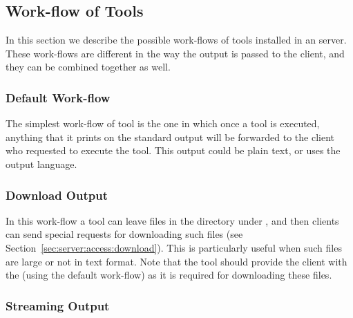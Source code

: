 \subsection{Work-flow of Tools}
\label{sec:server:config:workflow}

In this section we describe the possible work-flows of tools installed
in an \ei server. These work-flows are different in the way the output
is passed to the client, and they can be combined together as well.

\subsubsection{Default Work-flow}

The simplest work-flow of tool is the one in which once a tool is
executed, anything that it prints on the standard output will be
forwarded to the client who requested to execute the tool. This output
could be plain text, or uses the \ei output language.

\subsubsection{Download Output}

In this work-flow a tool can leave files in the directory under
, and then
clients can send special requests for downloading such files (see
Section~\ref{sec:server:access:download}).
%
This is particularly useful when such files are large or not in text
format.
%
Note that the tool should provide the client with the
 (using the default work-flow) as it is
required for downloading these files.
%

\subsubsection{Streaming Output}

